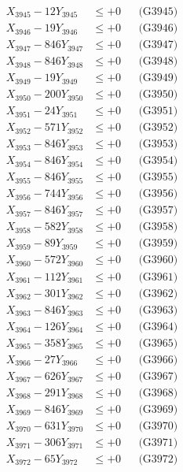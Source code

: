\documentclass[a4paper,10pt]{article}
\begin{document}
{\begin{align}
X_{3945} - 12Y_{3945} &\leq +0 && \text{(G3945)} \\
X_{3946} - 19Y_{3946} &\leq +0 && \text{(G3946)} \\
X_{3947} - 846Y_{3947} &\leq +0 && \text{(G3947)} \\
X_{3948} - 846Y_{3948} &\leq +0 && \text{(G3948)} \\
X_{3949} - 19Y_{3949} &\leq +0 && \text{(G3949)} \\
X_{3950} - 200Y_{3950} &\leq +0 && \text{(G3950)} \\
\allowbreak
X_{3951} - 24Y_{3951} &\leq +0 && \text{(G3951)} \\
X_{3952} - 571Y_{3952} &\leq +0 && \text{(G3952)} \\
X_{3953} - 846Y_{3953} &\leq +0 && \text{(G3953)} \\
X_{3954} - 846Y_{3954} &\leq +0 && \text{(G3954)} \\
X_{3955} - 846Y_{3955} &\leq +0 && \text{(G3955)} \\
X_{3956} - 744Y_{3956} &\leq +0 && \text{(G3956)} \\
X_{3957} - 846Y_{3957} &\leq +0 && \text{(G3957)} \\
X_{3958} - 582Y_{3958} &\leq +0 && \text{(G3958)} \\
X_{3959} - 89Y_{3959} &\leq +0 && \text{(G3959)} \\
X_{3960} - 572Y_{3960} &\leq +0 && \text{(G3960)} \\
\allowbreak
X_{3961} - 112Y_{3961} &\leq +0 && \text{(G3961)} \\
X_{3962} - 301Y_{3962} &\leq +0 && \text{(G3962)} \\
X_{3963} - 846Y_{3963} &\leq +0 && \text{(G3963)} \\
X_{3964} - 126Y_{3964} &\leq +0 && \text{(G3964)} \\
X_{3965} - 358Y_{3965} &\leq +0 && \text{(G3965)} \\
X_{3966} - 27Y_{3966} &\leq +0 && \text{(G3966)} \\
X_{3967} - 626Y_{3967} &\leq +0 && \text{(G3967)} \\
X_{3968} - 291Y_{3968} &\leq +0 && \text{(G3968)} \\
X_{3969} - 846Y_{3969} &\leq +0 && \text{(G3969)} \\
X_{3970} - 631Y_{3970} &\leq +0 && \text{(G3970)} \\
\allowbreak
X_{3971} - 306Y_{3971} &\leq +0 && \text{(G3971)} \\
X_{3972} - 65Y_{3972} &\leq +0 && \text{(G3972)} \\

\end{align}}
\end{document}
